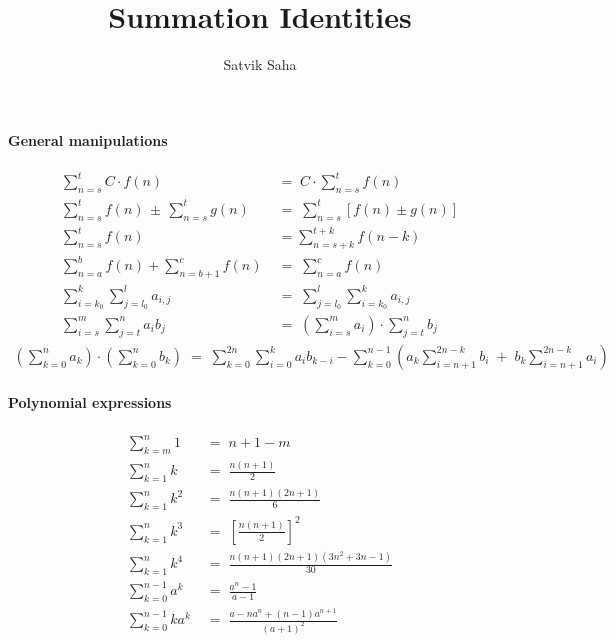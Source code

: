 \documentclass[a4paper, 11pt, reqno]{article}
\title{Summation Identities}
\author{Satvik Saha}
\date{}
\begin{document}
	\maketitle
	
	\paragraph{General manipulations}
	\begin{align*}
		\sum_{n=s}^{t} C\cdot f(n) \; &= \; C\cdot \sum_{n=s}^{t} f(n)	\\
		\sum_{n=s}^{t} f(n) \,\pm\, \sum_{n=s}^{t} g(n) \; &= \;  \sum_{n=s}^{t} \left[ f(n) \pm g(n) \right]	\\
		\sum_{n=s}^{t} f(n) \; &= \!  \sum_{n=s+k}^{t+k} f(n - k)	\\
		\sum_{n=a}^{b} f(n) + \!\!\sum_{n=b+1}^{c} f(n) \; &= \; \sum_{n=a}^{c} f(n)	\\
		\sum_{i=k_0}^{k} \sum_{j=l_0}^{l} a_{i,j} \; &= \; \sum_{j=l_0}^{l} \sum_{i=k_0}^{k} a_{i,j} \\
		\sum_{i=s}^{m} \sum_{j=t}^{n} a_i b_j \; &= \; \left( \sum_{i=s}^{m} a_i \right)\cdot \sum_{j=t}^{n} b_j
	\end{align*}
	\begin{align*}
		\left( \sum_{k=0}^{n} a_k  \right)\cdot \left( \sum_{k=0}^{n} b_k  \right)
			\; = \;  \sum_{k=0}^{2n}\sum_{i=0}^{k}a_i b_{k-i} - \sum_{k=0}^{n-1} \left( a_k \sum_{i=n+1}^{2n-k}b_i  
											\;+\;	    b_k \sum_{i=n+1}^{2n-k}a_i \right)     
	\end{align*}

	\paragraph{Polynomial expressions}
	\begin{align*}
		\sum_{k=m}^{n} 1 	\; &= \;  n + 1 - m	\\
		\sum_{k=1}^{n} k	\; &= \;  \frac{n(n + 1)}{2}	\\
		\sum_{k=1}^{n} k^2	\; &= \;  \frac{n(n + 1)(2n + 1)}{6}	\\
		\sum_{k=1}^{n} k^3	\; &= \;  \left[\frac{n(n + 1)}{2}\right]^2	\\
		\sum_{k=1}^{n} k^4	\; &= \;  \frac{n(n + 1)(2n + 1)(3n^2 + 3n - 1)}{30}	\\
		\sum_{k=0}^{n-1} a^k 	\; &= \;  \frac{a^n - 1}{a - 1}		\\
		\sum_{k=0}^{n-1} ka^k 	\; &= \;  \frac{a - na^n + (n - 1)a^{n+1}}{(a + 1)^2}
	\end{align*}
\end{document}
